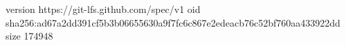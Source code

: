 version https://git-lfs.github.com/spec/v1
oid sha256:ad67a2dd391cf5b3b06655630a9f7fc6c867e2edeacb76c52bf760aa433922dd
size 174948
